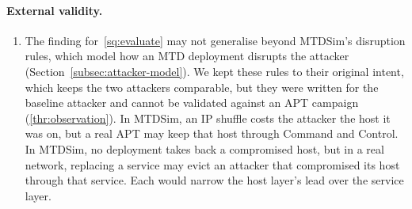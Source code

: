 \documentclass{cshonours}
\begin{document}
\paragraph{External validity.}
\begin{enumerate}[resume*=threats]
\item\label{thr:rules} The finding for~\ref{sq:evaluate} may not generalise
beyond MTDSim's disruption rules, which model how an MTD deployment disrupts
the attacker (Section~\ref{subsec:attacker-model}). We
kept these rules to their original intent, which keeps the two attackers
comparable, but they were written for the baseline attacker and cannot be
validated against an APT campaign (\ref{thr:observation}). In MTDSim, an IP
shuffle costs the attacker the host it was on, but a real APT may keep that
host through Command and Control. In MTDSim, no deployment takes back a
compromised host, but in a real network, replacing a service may evict an
attacker that compromised its host through that service. Each would narrow
the host layer's lead over the service layer.


\end{enumerate}
\end{document}

